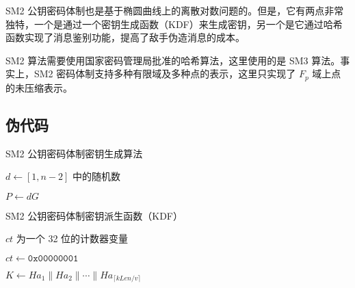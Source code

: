 \documentclass[12pt,a4paper]{article}
\begin{document}
SM2 公钥密码体制也是基于椭圆曲线上的离散对数问题的。但是，它有两点非常独特，一个是通过一个密钥生成函数（KDF）来生成密钥，另一个是它通过哈希函数实现了消息鉴别功能，提高了敌手伪造消息的成本。

SM2 算法需要使用国家密码管理局批准的哈希算法，这里使用的是 SM3 算法。事实上，SM2 密码体制支持多种有限域及多种点的表示，这里只实现了 $ F_p $ 域上点的未压缩表示。

\subsection*{伪代码}

\begin{algorithm}[H]
\caption{SM2 公钥密码体制密钥生成算法}

$ d \leftarrow [1, n - 2] $ 中的随机数

$ P \leftarrow d G $

\end{algorithm}

\begin{algorithm}[H]
\caption{SM2 公钥密码体制密钥派生函数（KDF）}

$ ct $ 为一个 32 位的计数器变量

$ ct \leftarrow \mathtt{0x00000001} $



$ K \leftarrow {Ha}_1 \parallel {Ha}_2 \parallel \cdots \parallel {Ha}_{\lceil kLen / v \rceil} $

\end{algorithm}

\newpage
\end{document}
